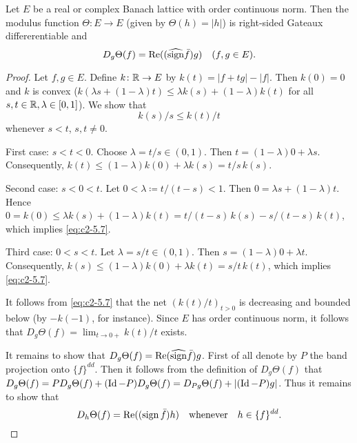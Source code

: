 \begin{proposition}\label{prop:c2-5.6}
Let $E$ be a real or complex Banach lattice with order continuous norm. 
Then the modulus function $\Theta \colon E \to E$ (given by $\Theta(h) = |h|$) is right-sided Gateaux differerentiable and
\begin{equation}\label{eq:c2-5.6}
D_{g}\Theta(f) = \mathop{}\!\mathrm{Re}((\widehat{\operatorname{sign}}  \bar{f})g) \quad (f, g \in E).
\end{equation}
\end{proposition}

\begin{proof}
Let $f, g \in E$. Define $k \colon \mathbb{R} \to E$ by $k(t) = |f+tg| - |f|$.
Then $k(0) = 0$ and $k$ is convex (\ie $k(\lambda s + (1-\lambda)t) \leq \lambda k(s) + (1-\lambda)k(t)$ for all $s, t \in \mathbb{R}, \lambda \in [0,1]$).
We show that
\begin{equation}\label{eq:c2-5.7}
k(s)/s \leq k(t)/t
\end{equation}
whenever $s < t$, $s,t \neq 0$.

First case: $s < t < 0$.
Choose $\lambda = t/s \in (0,1)$. 
Then $t = (1-\lambda)0 + \lambda s$. 
Consequently, $k(t) \leq (1-\lambda)k(0) + \lambda k(s) = t/s \, k(s)$.

Second case: $s < 0 < t$.
Let $0 < \lambda \coloneqq t/(t-s) < 1$. 
Then $0 = \lambda s + (1-\lambda)t$. 
Hence $0 = k(0) \leq \lambda k(s) + (1-\lambda)k(t) = t/(t-s) \, k(s) - s/(t-s) \, k(t)$, which implies \eqref{eq:c2-5.7}.

Third case: $0 < s < t$.
Let $\lambda = s/t \in (0,1)$. Then $s = (1-\lambda)0 + \lambda t$. Consequently, $k(s) \leq (1-\lambda)k(0) + \lambda k(t) = s/t \, k(t)$, which implies \eqref{eq:c2-5.7}.

It follows from \eqref{eq:c2-5.7} that the net $(k(t)/t)_{t>0}$ is decreasing and bounded below (by $-k(-1)$, for instance). Since $E$ has order continuous norm, it follows that $D_{g}\Theta(f) = \lim_{t \to 0+} k(t)/t$ exists.

It remains to show that $D_{g}\Theta(f) = \mathop{}\!\mathrm{Re}(\widehat{\operatorname{sign}}  \bar{f})g$.
First of all denote by $P$ the band projection onto $\{f\}^{dd}$. Then it
follows from the definition of $D_{g}\Theta(f)$ that $D_{g}\Theta(f) = PD_{g}\Theta(f) + (\operatorname{Id}-P)D_{g}\Theta(f) = D_{Pg}\Theta(f) + |(\operatorname{Id}-P)g|$. 
Thus it remains to show that
\begin{equation}\label{eq:c2-5.8}
D_{h}\Theta(f) = \mathop{}\!\mathrm{Re}((\operatorname{sign}  \bar{f})h) \quad \text{whenever} \quad h \in \{f\}^{dd}.
\end{equation}


\end{proof}
